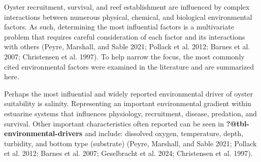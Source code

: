 \documentclass[
  letterpaper,
  DIV=11,
  numbers=noendperiod]{scrartcl}
\begin{document}
Oyster recruitment, survival, and reef establishment are influenced by
complex interactions between numerous physical, chemical, and biological
environmental factors. As such, determining the most influential factors
is a multivariate problem that requires careful consideration of each
factor and its interactions with others (Peyre, Marshall, and Sable
2021; Pollack et al. 2012; Barnes et al. 2007; Christensen et al. 1997).
To help narrow the focus, the most commonly cited environmental factors
were examined in the literature and are summarized here.

Perhaps the most influential and widely reported environmental driver of
oyster suitability is salinity. Representing an important environmental
gradient within estuarine systems that influences physiology,
recruitment, disease, predation, and survival. Other important
characteristics often reported can be seen in
\textbf{?@tbl-environmental-drivers} and include: dissolved oxygen,
temperature, depth, turbidity, and bottom type (substrate) (Peyre,
Marshall, and Sable 2021; Pollack et al. 2012; Barnes et al. 2007;
Geselbracht et al. 2024; Christensen et al. 1997).
\end{document}
